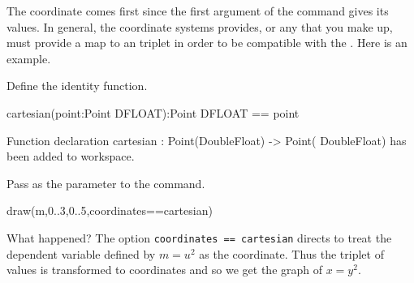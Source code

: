 The  coordinate comes first since the first argument of
the  command gives its values.
In general, the coordinate systems \Language{} provides, or any
that you make up, must provide a map to an  triplet in
order to be compatible with the
 .
Here is an example.

\begin{xtc}
\begin{xtccomment}
Define the identity function.
\end{xtccomment}
\begin{spadsrc}
cartesian(point:Point DFLOAT):Point DFLOAT == point 
\end{spadsrc}
\begin{MessageOutput}
   Function declaration cartesian : Point(DoubleFloat) -> Point(
      DoubleFloat) has been added to workspace.
\end{MessageOutput}
\end{xtc}
\begin{psXtc}
\begin{xtccomment}
Pass  as the 
parameter to the  command.
\end{xtccomment}
\begin{spadsrc}
draw(m,0..3,0..5,coordinates==cartesian) 
\end{spadsrc}
\end{psXtc}
%

What happened?
The option {\tt coordinates == cartesian} directs \Language{} to
treat the dependent variable  defined by
$m=u^2$ as the  coordinate.
Thus the triplet of values  is transformed to
coordinates  and so we get the graph of
$x=y^2$.

